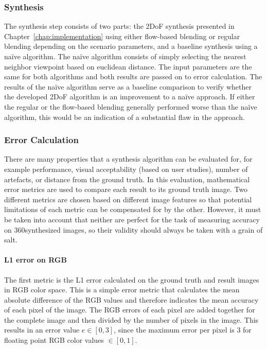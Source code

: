 \subsubsection{Synthesis}
The synthesis step consists of two parts: the 2DoF synthesis presented in Chapter~\ref{chap:implementation} using either flow-based blending or regular blending depending on the scenario parameters, and a baseline synthesis using a na\"ive algorithm.
The na\"ive algorithm consists of simply selecting the nearest neighbor viewpoint based on euclidean distance. The input parameters are the same for both algorithms and both results are passed on to error calculation.
The results of the na\"ive algorithm serve as a baseline comparison to verify whether the developed 2DoF algorithm is an improvement to a na\"ive approach. If either the regular or the flow-based blending generally performed worse than the na\"ive algorithm, this would be an indication of a substantial flaw in the approach.

\subsubsection{Error Calculation}
There are many properties that a synthesis algorithm can be evaluated for, for example performance, visual acceptability (based on user studies), number of artefacts, or distance from the ground truth. In this evaluation, mathematical
error metrics are used to compare each result to its ground truth image.  Two different metrics are chosen based on different image features so that potential limitations of each metric can be compensated for by the other. However, it must be taken into account that neither are perfect for the task of measuring accuracy on 360\degree synthesized images, so their validity should always be taken with a grain of salt. 

\paragraph{L1 error on RGB}
The first metric is the L1 error calculated on the ground truth and result images in RGB color space. This is a simple error metric that calculates the mean absolute difference of the RGB values and therefore indicates the mean accuracy of each pixel of the image. The RGB errors of each pixel are added together for the complete image and then divided by the number of pixels in the image. This results in an error value $e \in [0,3]$, since the maximum error per pixel is 3 for floating point RGB color values $\in [0,1]$.

